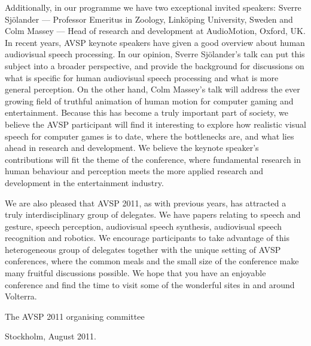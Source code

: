 Additionally, in our programme we have two exceptional invited speakers: Sverre Sjölander --- Professor Emeritus in Zoology, Linköping University, Sweden and Colm Massey --- Head of research and development at AudioMotion, Oxford, UK. In recent years, AVSP keynote speakers have given a good overview about human audiovisual speech processing. In our opinion, Sverre Sjölander's talk can put this subject into a broader perspective, and provide the background for discussions on what is specific for human audiovisual speech processing and what is more general perception. On the other hand, Colm Massey's talk will address the ever growing field of truthful animation of human motion for computer gaming and entertainment. Because this has become a truly important part of society, we believe the AVSP participant will find it interesting to explore how realistic visual speech for computer games is to date, where the bottlenecks are, and what lies ahead in research and development. We believe the keynote speaker's contributions will fit the theme of the conference, where fundamental research in human behaviour and perception meets the more applied research and development in the entertainment industry. 

We are also pleased that AVSP 2011, as with previous years, has attracted a truly interdisciplinary group of delegates. We have papers relating to speech and gesture, speech perception, audiovisual speech synthesis, audiovisual speech recognition and robotics. We encourage participants to take advantage of this heterogeneous group of delegates together with the unique setting of AVSP conferences, where the common meals and the small size of the conference make many fruitful discussions possible. We hope that you have an enjoyable conference and find the time to visit some of the wonderful sites in and around Volterra.

\vspace{1cm}
\noindent The AVSP 2011 organising committee

\noindent Stockholm, August 2011.

\newpage
